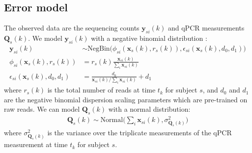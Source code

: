 \documentclass{article}
\newcommand{\Normaldist}{\text{Normal}}
\newcommand{\NegBindist}{\text{NegBin}}
\newcommand{\xsik}[3]{\mathbf{x}_{#1 #2}(#3)}
\newcommand{\xsk}[2]{\mathbf{x}_{#1}(#2)}
\newcommand{\countsik}[3]{\mathbf{y}_{#1 #2}(#3)}
\newcommand{\countparamone}{d_0}
\newcommand{\countparamtwo}{d_1}
\newcommand{\qpcrsk}[2]{\mathbf{Q}_{#1}(#2)}
\begin{document}
\subsection{Error model}
\label{subsection:error model def}
The observed data are the sequencing counts $\countsik{s}{i}{k}$ and qPCR measurements $\qpcrsk{s}{k}$. We model $\countsik{s}{i}{k}$ with a negative binomial distribution \cite{cite:negbin}:
\begin{align}
    \countsik{s}{i}{k} & \sim \NegBindist \Big( 
        \phi_{si}(\xsk{s}{k}, r_s(k)),
        \epsilon_{si}(\xsk{s}{k}, \countparamone, \countparamtwo)
        \Big) \\
    \phi_{si}(\xsk{s}{k}, r_s(k)) & = r_s (k) 
        \frac{\xsik{s}{i}{k}}{\sum_i \xsik{s}{i}{k}} \\
    \epsilon_{si}(\xsk{s}{k}, \countparamone, \countparamtwo) & = 
        \frac{\countparamone}
        {\xsik{s}{i}{k} / \sum_i \xsik{s}{i}{k}} + \countparamtwo
\end{align}
where $r_s (k)$ is the total number of reads at time $t_k$ for subject $s$, and $\countparamone$ and $\countparamtwo$ are the negative binomial dispersion scaling parameters which are pre-trained on raw reads. We can model $\qpcrsk{s}{k}$ with a normal distribution:
\begin{align}
    \qpcrsk{s}{k} \sim \Normaldist \Big(
        \sum_i \xsik{s}{i}{k}, \sigma^2_{\qpcrsk{s}{k}}
    \Big)
\end{align}
where $\sigma^2_{\qpcrsk{s}{k}}$ is the variance over the triplicate measurements of the qPCR measurement at time $t_k$ for subject $s$.


\end{document}
